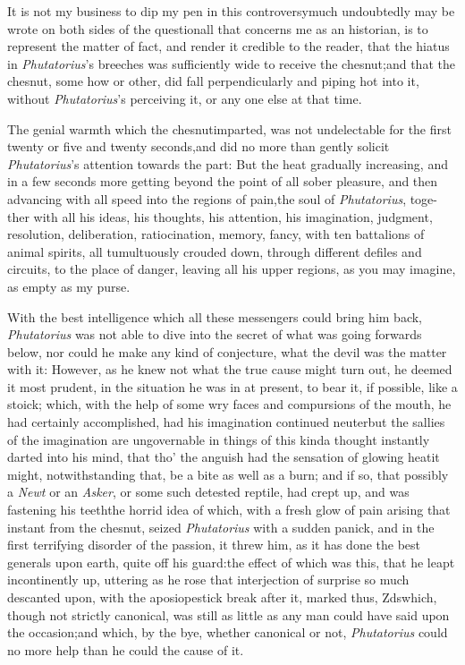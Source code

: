 \documentclass{article}
\begin{document}
It is not my business to dip my pen in this
controversy\tsh much undoubtedly may be wrote on both
sides of the question\tsk all that concerns me as an historian,
is to represent the matter of fact, and render it credible to the
reader, that the hiatus in \textit{Phutatorius}’s breeches was
sufficiently wide to receive the ches\-nut;\break\tsh and that the
chesnut, some how or other, did fall perpendicularly and piping hot
into it, without \textit{Phutatorius}’s perceiving it, or any
one else at that time.

The genial warmth which the chesnut\break imparted, was not
undelectable for the first twenty or five and twenty
seconds,\tsk and did no more than gently solicit
\textit{Phutatorius}’s attention towards the
part:\tsk\break
But the heat gradually increasing, and in a few
seconds more getting beyond the point of all sober pleasure, and
then advancing with all speed into the regions of pain,\tsk the soul of
\textit{Phutatorius}, toge- ther with all his ideas, his thoughts, his
attention, his imagination, judgment, resolution, deliberation,
ratiocination, memory, fancy, with ten battalions of animal
spirits, all tumultuously crouded down, through different defiles
and circuits, to the place of danger, leaving all his upper
regions, as you may imagine, as empty as my purse.

With the best intelligence which all these messengers could
bring him back, \textit{Phutatorius} was not able to dive into the
secret of what was going forwards below, nor could he make any kind
of conjecture, what the devil was the matter with it: However, as
he knew not what the true cause might turn out, he deemed it most
prudent, in the situation he was in at present, to bear it,
if possible, like a stoick;
which, with the help of some
wry faces and compursions of the
mouth, he had certainly accomplished, had his imagination continued
neuter\tsh but the sallies of the imagination are
ungovernable in things of this kind\tsk a thought instantly
darted into his mind, that tho’ the anguish had the sensation
of glowing heat\tsk it might, notwithstanding that, be a bite as
well as a burn; and if so, that possibly a \textit{Newt} or an
\textit{Asker}, or some such detested reptile, had crept up, and was
fastening his teeth\tsh the horrid idea of which, with a
fresh glow of pain arising that instant from the chesnut, seized
\textit{Phutatorius} with a sudden panick, and in the first
terrifying disorder of the passion, it threw him, as it has done
the best generals upon earth, quite off his guard:\tsk the
effect of which was this, that he leapt incontinently up, uttering
as he rose that interjection of surprise so much descanted upon,
with the apo\-sio\-pestick break after it, marked thus,\break
Z\tsh ds\tsk which, though not strictly canonical, was still as little as any man
could have said upon the occasion;\tsh\break and which,
by the bye, whether canonical or not, \textit{Phutatorius} could no
more help than he could the cause of it.
\end{document}
